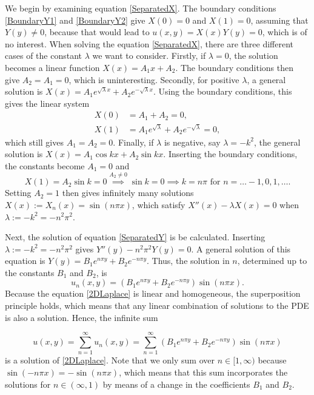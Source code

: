 We begin by examining equation \eqref{SeparatedX}. The boundary conditions \eqref{BoundaryY1} and \eqref{BoundaryY2} give $X(0) = 0$ and $X(1) = 0$, assuming that $Y(y) \neq 0$, because that would lead to $u(x,y) = X(x)Y(y) = 0$, which is of no interest. When solving the equation \eqref{SeparatedX}, there are three different cases of the constant $\lambda$ we want to consider. Firstly, if $\lambda = 0$, the solution becomes a linear function $X(x) = A_1x+A_2$. The boundary conditions then give $A_2 = A_1 = 0$, which is uninteresting. Secondly, for positive $\lambda$, a general solution is $X(x) = A_1e^{\sqrt{\lambda}x} + A_2e^{-\sqrt{\lambda}x}$. Using the boundary conditions, this gives the linear system 
\begin{equation*}
\begin{split}
    X(0) &= A_1 + A_2 = 0, \\
    X(1) &= A_1e^{\sqrt{\lambda}} + A_2e^{-\sqrt{\lambda}} = 0, 
\end{split}
\end{equation*}
which still gives $A_1 = A_2 = 0$. Finally, if $\lambda$ is negative, say $\lambda = -k^2$, the general solution is $X(x) = A_1 \cos{kx} + A_2\sin{kx}$. Inserting the boundary conditions, the constants become $A_1 = 0$ and 
\begin{equation*}
    X(1) = A_2 \sin{k} = 0 \overset{A_2 \neq 0} \implies \sin{k} = 0 \implies k = n\pi \text{ for } n={\dots} -1,0,1, \dots .
\end{equation*}
Setting $A_2 = 1$ then gives infinitely many solutions $X(x) := X_n(x) = \sin{(n\pi x)}$, which satisfy $X''(x)-\lambda X(x) = 0$ when $\lambda := -k^2 = -n^2\pi^2$. 

Next, the solution of equation \eqref{SeparatedY} is be calculated. Inserting $\lambda := -k^2 = -n^2\pi^2$ gives $Y''(y)-n^2\pi^2Y(y) = 0$. A general solution of this equation is $Y(y) = B_1e^{n\pi y} + B_2e^{-n\pi y}$. Thus, the solution in $n$, determined up to the constants $B_1$ and $B_2$, is
\begin{equation*}
    \label{SeparatedWithConstants}
    u_n(x,y) = (B_1e^{n\pi y} + B_2e^{-n\pi y})\sin{(n\pi x)}.
\end{equation*}
Because the equation \eqref{2DLaplace} is linear and homogeneous, the superposition principle holds, which means that any linear combination of solutions to the PDE is also a solution. Hence, the infinite sum

\begin{equation}
    u(x,y) = \sum_{n=1}^\infty u_n(x,y) = \sum_{n=1}^\infty (B_1e^{n\pi y} + B_2e^{-n\pi y})\sin{(n\pi x)}
    \label{task3aInfiniteSumBeforeBCsFulfilled}
\end{equation}
is a solution of \eqref{2DLaplace}. Note that we only sum over $n \in [1, \infty)$ because $\sin{(-n\pi x)} = -\sin{(n\pi x)}$, which means that this sum incorporates the solutions for $n \in (\infty, 1)$ by means of a change in the coefficients $B_1$ and $B_2$. 

